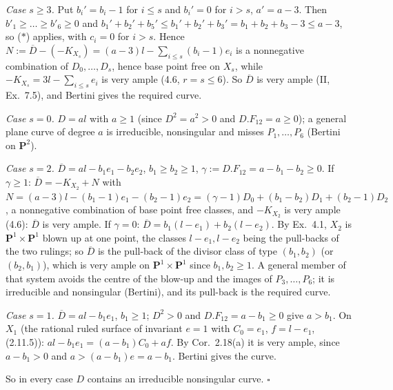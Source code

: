 \documentclass[11pt]{article}
\begin{document}
\emph{Case $s\ge3$.} Put $b_i'=b_i-1$ for $i\le s$ and $b_i'=0$ for $i>s$, $a'=a-3$. Then $b'_1\ge\dots\ge b'_6\ge0$ and $b_1'+b_2'+b_5'\le b_1'+b_2'+b_3'=b_1+b_2+b_3-3\le a-3$, so ($*$) applies, with $c_i=0$ for $i>s$. Hence $N:=\overline D-(-K_{X_s})=(a-3)l-\sum_{i\le s}(b_i-1)e_i$ is a nonnegative combination of $D_0,\dots,D_s$, hence base point free on $X_s$, while $-K_{X_s}=3l-\sum_{i\le s}e_i$ is very ample (4.6, $r=s\le6$). So $\overline D$ is very ample (II, Ex.~7.5), and Bertini gives the required curve.

\emph{Case $s=0$.} $D=al$ with $a\ge1$ (since $D^2=a^2>0$ and $D.F_{12}=a\ge0$); a general plane curve of degree $a$ is irreducible, nonsingular and misses $P_1,\dots,P_6$ (Bertini on $\mathbf P^2$).

\emph{Case $s=2$.} $\overline D=al-b_1e_1-b_2e_2$, $b_1\ge b_2\ge1$, $\gamma:=D.F_{12}=a-b_1-b_2\ge0$. If $\gamma\ge1$: $\overline D=-K_{X_2}+N$ with $N=(a-3)l-(b_1-1)e_1-(b_2-1)e_2=(\gamma-1)D_0+(b_1-b_2)D_1+(b_2-1)D_2$, a nonnegative combination of base point free classes, and $-K_{X_2}$ is very ample (4.6): $\overline D$ is very ample. If $\gamma=0$: $\overline D=b_1(l-e_1)+b_2(l-e_2)$. By Ex.~4.1, $X_2$ is $\mathbf P^1\times\mathbf P^1$ blown up at one point, the classes $l-e_1,l-e_2$ being the pull-backs of the two rulings; so $\overline D$ is the pull-back of the divisor class of type $(b_1,b_2)$ (or $(b_2,b_1)$), which is very ample on $\mathbf P^1\times\mathbf P^1$ since $b_1,b_2\ge1$. A general member of that system avoids the centre of the blow-up and the images of $P_3,\dots,P_6$; it is irreducible and nonsingular (Bertini), and its pull-back is the required curve.

\emph{Case $s=1$.} $\overline D=al-b_1e_1$, $b_1\ge1$; $D^2>0$ and $D.F_{12}=a-b_1\ge0$ give $a>b_1$. On $X_1$ (the rational ruled surface of invariant $e=1$ with $C_0=e_1$, $f=l-e_1$, (2.11.5)): $al-b_1e_1=(a-b_1)C_0+af$. By Cor.~2.18(a) it is very ample, since $a-b_1>0$ and $a>(a-b_1)e=a-b_1$. Bertini gives the curve.

So in every case $D$ contains an irreducible nonsingular curve. \hfill$\square$
\end{document}
